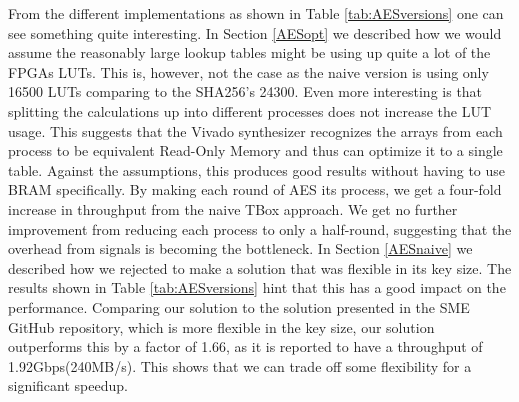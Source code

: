 \documentclass[a4paper, openany]{book}
\begin{document}
\begin{abstact}
From the different implementations as shown in Table \ref{tab:AESversions} one can see something quite interesting. In Section \ref{AESopt} we described how we would assume the reasonably large lookup tables might be using up quite a lot of the FPGAs LUTs. This is, however, not the case as the naive version is using only 16500 LUTs comparing to the SHA256's 24300. Even more interesting is that splitting the calculations up into different processes does not increase the LUT usage. This suggests that the Vivado synthesizer recognizes the arrays from each process to be equivalent Read-Only Memory and thus can optimize it to a single table. Against the assumptions, this produces good results without having to use BRAM specifically. By making each round of AES its process, we get a four-fold increase in throughput from the naive TBox approach. We get no further improvement from reducing each process to only a half-round, suggesting that the overhead from signals is becoming the bottleneck.
In Section \ref{AESnaive} we described how we rejected to make a solution that was flexible in its key size. The results shown in Table \ref{tab:AESversions} hint that this has a good impact on the performance. Comparing our solution to the solution presented in the SME GitHub repository, which is more flexible in the key size, our solution outperforms this by a factor of 1.66, as it is reported to have a throughput of 1.92Gbps(240MB/s)\cite{sme}. This shows that we can trade off some flexibility for a significant speedup.


\end{abstact}
\end{document}
